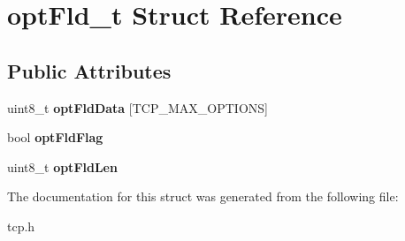 \hypertarget{structoptFld__t}{}\section{opt\+Fld\+\_\+t Struct Reference}
\label{structoptFld__t}
\subsection*{Public Attributes}
\begin{DoxyCompactItemize}
\item 
\mbox{\label{structoptFld__t_ab6302c029f258616fa73177eab1e6d5f}} 
uint8\+\_\+t {\bfseries opt\+Fld\+Data} \mbox{[}T\+C\+P\+\_\+\+M\+A\+X\+\_\+\+O\+P\+T\+I\+O\+NS\mbox{]}
\item 
\mbox{\label{structoptFld__t_ac73a04aef59f8fa1e56dfa7120edda44}} 
bool {\bfseries opt\+Fld\+Flag}
\item 
\mbox{\label{structoptFld__t_a910e4d371530c9c598bfae3e9fcdac3f}} 
uint8\+\_\+t {\bfseries opt\+Fld\+Len}
\end{DoxyCompactItemize}


The documentation for this struct was generated from the following file\+:\begin{DoxyCompactItemize}
\item 
tcp.\+h\end{DoxyCompactItemize}
